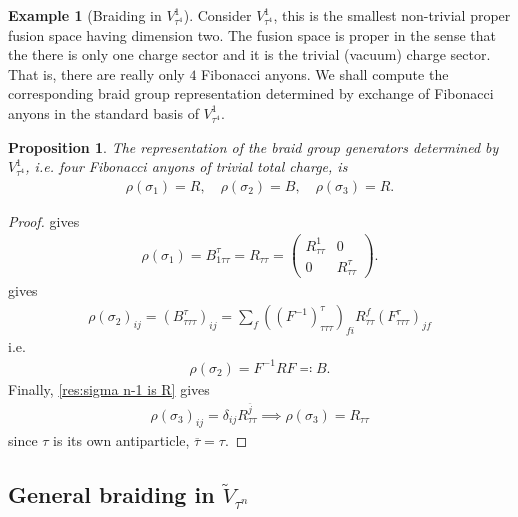 \documentclass[a4paper,10pt,oneside]{book}
\theoremstyle{plain}
\newtheorem{proposition}[theorem]{Proposition}
\theoremstyle{definition}
\newtheorem{example}{Example}[section]
\theoremstyle{remark}
\begin{document}
\begin{example}[Braiding in $V_{τ^4}^1$]
  Consider $V_{τ^4}^1$, this is the smallest non-trivial proper fusion space having dimension two. The fusion space is proper in the sense that the there is only one charge sector and it is the trivial (vacuum) charge sector. That is, there are really only $4$ Fibonacci anyons. We shall compute the corresponding braid group representation determined by exchange of Fibonacci anyons in the standard basis of $V_{τ^4}^1$.

  \begin{proposition}
    The representation of the braid group generators determined by $V_{τ^4}^1$, i.e. four Fibonacci anyons of trivial total charge, is
    \begin{align*}
      ρ(σ_1) = R,\quad
      ρ(σ_2) = B,\quad
      ρ(σ_3) = R.
    \end{align*}
  \end{proposition}

  \begin{proof}
     gives
    \begin{align*}
      ρ(σ_1) = B_{1ττ}^{τ} = R_{ττ} =
      \begin{pmatrix}
        R_{ττ}^1 & 0 \\
        0 & R_{ττ}^τ
      \end{pmatrix}.
    \end{align*}
     gives
    \begin{align*}
      ρ(σ_2)_{ij} = \left( B^τ_{τττ} \right)_{ij} = \sum_f \left( \left(F^{-1}\right)_{τττ}^τ \right)_{fi} R_{ττ}^f \left( F_{τττ}^τ \right)_{jf}
    \end{align*}
    i.e.
    \begin{align*}
      ρ(σ_2) = F^{-1} R F \eqqcolon B.
    \end{align*}
    Finally, \cref{res:sigma n-1 is R} gives
    \begin{align*}
      ρ(σ_3)_{ij} = \delta_{ij} R_{ττ}^{\overline{j}}
      \implies
      ρ(σ_3) = R_{ττ}
    \end{align*}
    since $τ$ is its own antiparticle, $\overline{τ} = τ$.
  \end{proof}
\end{example}






\subsection{General braiding in \texorpdfstring{$\widetilde{V}_{τ^n}$}{V\~_(τⁿ)}}
\end{document}
